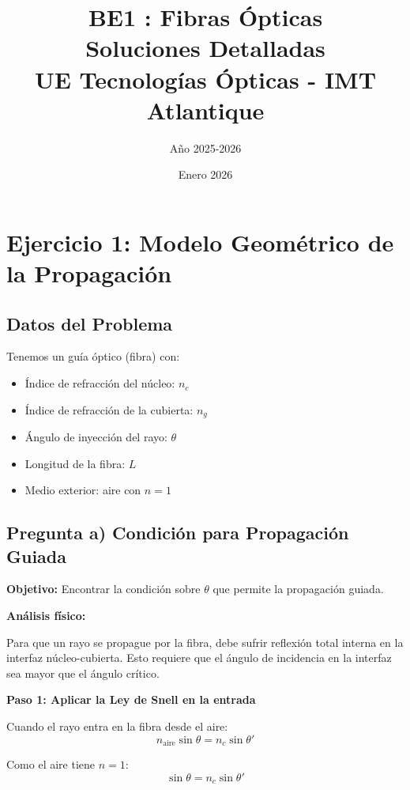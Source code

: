 \documentclass[11pt,a4paper]{article}
\title{\textbf{BE1 : Fibras Ópticas}\\
\large Soluciones Detalladas\\
UE Tecnologías Ópticas - IMT Atlantique}
\author{Año 2025-2026}
\date{Enero 2026}
\begin{document}
\maketitle
\tableofcontents
\newpage

\section{Ejercicio 1: Modelo Geométrico de la Propagación}

\subsection{Datos del Problema}

Tenemos un guía óptico (fibra) con:
\begin{itemize}
    \item Índice de refracción del núcleo: $n_c$
    \item Índice de refracción de la cubierta: $n_g$
    \item Ángulo de inyección del rayo: $\theta$
    \item Longitud de la fibra: $L$
    \item Medio exterior: aire con $n = 1$
\end{itemize}

\subsection{Pregunta a) Condición para Propagación Guiada}

\textbf{Objetivo:} Encontrar la condición sobre $\theta$ que permite la propagación guiada.

\textbf{Análisis físico:}

Para que un rayo se propague por la fibra, debe sufrir reflexión total interna en la interfaz núcleo-cubierta. Esto requiere que el ángulo de incidencia en la interfaz sea mayor que el ángulo crítico.

\textbf{Paso 1: Aplicar la Ley de Snell en la entrada}

Cuando el rayo entra en la fibra desde el aire:
\begin{equation}
    n_{\text{aire}} \sin\theta = n_c \sin\theta'
\end{equation}

Como el aire tiene $n = 1$:
\begin{equation}
    \sin\theta = n_c \sin\theta'
\end{equation}
\end{document}
